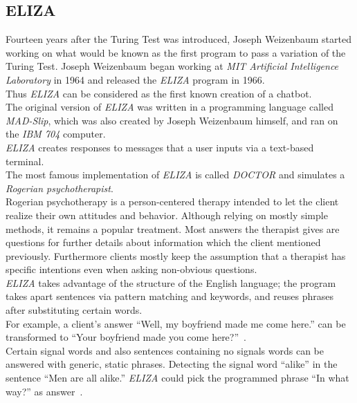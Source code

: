 \subsection{ELIZA}
\label{eliza}

Fourteen years after the Turing Test was introduced, Joseph Weizenbaum started working on what would be known as the first program to pass a variation of the Turing Test.
Joseph Weizenbaum began working at \emph{MIT Artificial Intelligence Laboratory} in 1964 and released the \emph{ELIZA} program in 1966.
\\
Thus \emph{ELIZA} can be considered as the first known creation of a chatbot.
\\

The original version of \emph{ELIZA} was written in a programming language called \emph{MAD-Slip},
which was also created by Joseph Weizenbaum himself, and ran on the \emph{IBM 704} computer.
\\
\emph{ELIZA} creates responses to messages that a user inputs via a text-based terminal.
\\

The most famous implementation of \emph{ELIZA} is called \emph{DOCTOR} and simulates a \emph{Rogerian psychotherapist}.
\\
Rogerian psychotherapy is a person-centered therapy intended to let the client realize their own attitudes and behavior.
Although relying on mostly simple methods, it remains a popular treatment.
Most answers the therapist gives are questions for further details about information which the client mentioned previously.
Furthermore clients mostly keep the assumption that a therapist has specific intentions even when asking non-obvious questions.
\\

\emph{ELIZA} takes advantage of the structure of the English language;
the program takes apart sentences via pattern matching and keywords, and reuses phrases after substituting certain words.
\\
For example, a client's answer ``Well, my boyfriend made me come here.'' can be transformed to ``Your boyfriend made you come here?''~\cite{elizatest}.
\\
Certain signal words and also sentences containing no signals words can be answered with generic, static phrases.
Detecting the signal word ``alike'' in the sentence ``Men are all alike.'' \emph{ELIZA} could pick the programmed phrase ``In what way?'' as answer~\cite{elizatest}.
\\

